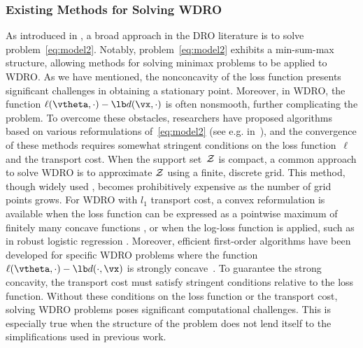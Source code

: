 	\subsubsection{Existing Methods for Solving WDRO}
	As introduced in \cite{rahimian2019distributionally}, a broad approach in the DRO literature is to solve problem~\eqref{eq:model2}. Notably, problem~\eqref{eq:model2} exhibits a min-sum-max structure, allowing methods for solving minimax problems to be applied to WDRO.
	As we have mentioned, the nonconcavity of the loss function presents significant challenges in obtaining a stationary point. Moreover, in WDRO, the function $\ell(\vtheta,\cdot) - \lb d(\vx,\cdot)$ is often nonsmooth, further complicating the problem. To overcome these obstacles, researchers have proposed algorithms based on various reformulations of~\eqref{eq:model2} (see e.g. in~\cite{gao2023distributionally,mohajerin2018data,wozabal2012framework,kuhn2019wasserstein,liu2021discrete}),  and the convergence of these methods requires somewhat stringent conditions on the loss function~$\ell$ and the transport cost.
	When the %
	{support} set~$\cal{Z}$
	is compact, a common approach to solve WDRO is to approximate $\cal{Z}$ using a finite, discrete grid. This method, though widely used \cite{xu2018distributionally,chen2021decomposition, liu2021discrete, pflug2007ambiguity}, becomes prohibitively expensive as the number of grid points grows. For WDRO with $l_1$ transport cost, a convex reformulation is available when the loss function can be expressed as a pointwise maximum of finitely many concave functions \cite{mohajerin2018data,gao2023distributionally}, or when the log-loss function is applied, such as in robust logistic regression \cite{li2019first,selvi2022wasserstein,shafieezadeh2015distributionally}. Moreover, efficient first-order algorithms have been developed for specific WDRO problems where the function $\ell(\vtheta,\cdot)-\lb d(\cdot,\vx)$ is strongly concave~\cite{blanchet2022optimal, sinha2018certifiable}.  To guarantee the strong concavity, the transport cost must satisfy stringent conditions relative to the loss function. %
	Without these conditions on the loss function or the transport cost, solving WDRO problems poses significant computational challenges. This is especially true when the structure of the problem does not lend itself to the simplifications used in previous work. 
	
